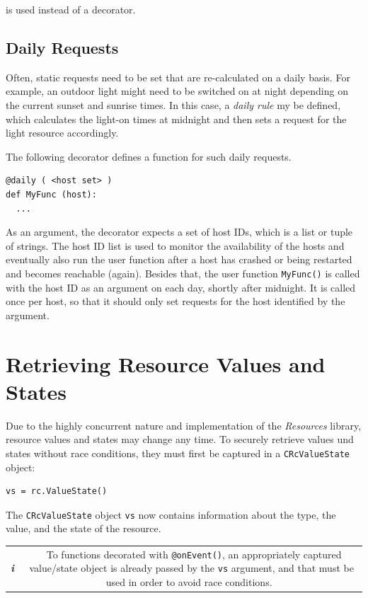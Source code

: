 \documentclass[12pt,english,parskip=half]{scrreprt}
\newcommand{\infobox}[1]{
  \hfill
  \setlength\arrayrulewidth{1pt}
  \begin{tabular}[t]{c|c|}
    \parbox{1.8em}{\hfill\textit{\Huge\textbf{i}\,}}
    &
    \,\parbox{0.89\linewidth}{\setlength{\parskip}{0.5em}#1}\,
  \end{tabular}
  \par
}
\begin{document}
is used instead of a decorator.



\subsection{Daily Requests}

Often, static requests need to be set that are re-calculated on a daily basis.
For example, an outdoor light might need to be switched on at night depending on the current
sunset and sunrise times. In this case, a \emph{daily rule} my be defined, which
calculates the light-on times at midnight and then sets a request for the light resource
accordingly.

The following decorator defines a function for such daily requests.

\begin{lstlisting}
@daily ( <host set> )
def MyFunc (host):
  ...
\end{lstlisting}

As an argument, the decorator expects a set of host IDs, which is a list or tuple of
strings. The host ID list is used to monitor the availability of the hosts and
eventually also run the user function after a host has crashed or being restarted
and becomes reachable (again).
Besides that, the user function \texttt{MyFunc()} is called with the host ID as an argument on each day, shortly after midnight. It is called once per host, so that it should only
set requests for the host identified by the argument.



\section{Retrieving Resource Values and States}
\label{sec:rules-values}

Due to the highly concurrent nature and implementation of the
\emph{Resources} library, resource values and states may change any
time. To securely retrieve values und states without race conditions,
they must first be captured in a \texttt{CRcValueState} object:

\begin{lstlisting}
vs = rc.ValueState()
\end{lstlisting}

The \texttt{CRcValueState} object \texttt{vs} now contains
information about the type, the value, and the state of the resource.

\infobox{
  To functions decorated with \texttt{@onEvent()}, an appropriately captured value/state
  object is already passed by the \texttt{vs} argument, and that must be used in order
  to avoid race conditions.
}
\end{document}

